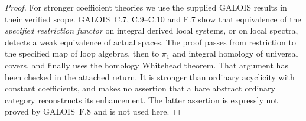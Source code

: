 \begin{proof}
For stronger coefficient theories we use the supplied GALOIS results in their verified scope. GALOIS~C.7, C.9--C.10 and F.7 show that equivalence of the \emph{specified restriction functor} on integral derived local systems, or on local spectra, detects a weak equivalence of actual spaces. The proof passes from restriction to the specified map of loop algebras, then to $\pi_1$ and integral homology of universal covers, and finally uses the homology Whitehead theorem. That argument has been checked in the attached return. It is stronger than ordinary acyclicity with constant coefficients, and makes no assertion that a bare abstract ordinary category reconstructs its enhancement. The latter assertion is expressly not proved by GALOIS~F.8 and is not used here. 
\end{proof}

